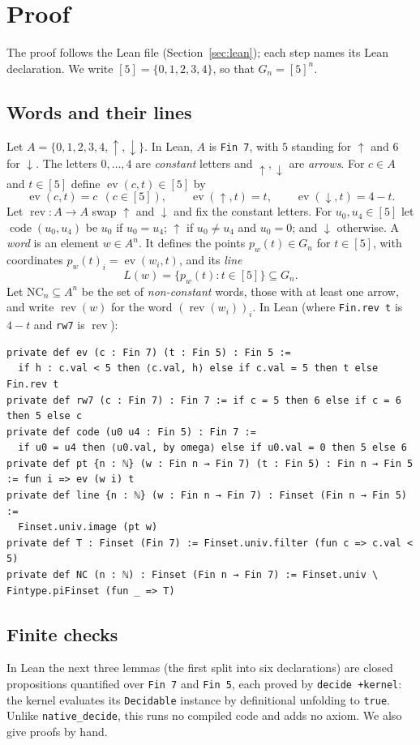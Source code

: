 \documentclass[11pt]{amsart}
\theoremstyle{plain}
\theoremstyle{definition}
\newcommand{\up}{{\uparrow}}
\newcommand{\dn}{{\downarrow}}
\newcommand{\ev}{\operatorname{ev}}
\newcommand{\rev}{\operatorname{rev}}
\newcommand{\code}{\operatorname{code}}
\newcommand{\NC}{\mathrm{NC}}
\begin{document}
\section{Proof}\label{sec:proof}

The proof follows the Lean file (Section~\ref{sec:lean}); each step names its Lean declaration. We write $[5]=\{0,1,2,3,4\}$, so that $G_n=[5]^n$.

\subsection{Words and their lines}
Let $A=\{0,1,2,3,4,\up,\dn\}$. In Lean, $A$ is \texttt{Fin 7}, with $5$ standing for $\up$ and $6$ for $\dn$.
The letters $0,\dots,4$ are \emph{constant} letters and $\up,\dn$ are \emph{arrows}.
For $c\in A$ and $t\in[5]$ define $\ev(c,t)\in[5]$ by
\[
  \ev(c,t)=c\ \ (c\in[5]),\qquad \ev(\up,t)=t,\qquad \ev(\dn,t)=4-t .
\]
Let $\rev\colon A\to A$ swap $\up$ and $\dn$ and fix the constant letters. For $u_0,u_4\in[5]$ let $\code(u_0,u_4)$ be $u_0$ if $u_0=u_4$; $\up$ if $u_0\ne u_4$ and $u_0=0$; and $\dn$ otherwise.
A \emph{word} is an element $w\in A^n$. It defines the points $p_w(t)\in G_n$ for $t\in[5]$, with coordinates $p_w(t)_i=\ev(w_i,t)$, and its \emph{line}
\[
  L(w)=\{p_w(t): t\in[5]\}\subseteq G_n .
\]
Let $\NC_n\subseteq A^n$ be the set of \emph{non-constant} words, those with at least one arrow, and write $\rev(w)$ for the word $(\rev(w_i))_i$.
In Lean (where \texttt{Fin.rev t} is $4-t$ and \texttt{rw7} is $\rev$):
\begin{lstlisting}
private def ev (c : Fin 7) (t : Fin 5) : Fin 5 :=
  if h : c.val < 5 then ⟨c.val, h⟩ else if c.val = 5 then t else Fin.rev t
private def rw7 (c : Fin 7) : Fin 7 := if c = 5 then 6 else if c = 6 then 5 else c
private def code (u0 u4 : Fin 5) : Fin 7 :=
  if u0 = u4 then ⟨u0.val, by omega⟩ else if u0.val = 0 then 5 else 6
private def pt {n : ℕ} (w : Fin n → Fin 7) (t : Fin 5) : Fin n → Fin 5 := fun i => ev (w i) t
private def line {n : ℕ} (w : Fin n → Fin 7) : Finset (Fin n → Fin 5) :=
  Finset.univ.image (pt w)
private def T : Finset (Fin 7) := Finset.univ.filter (fun c => c.val < 5)
private def NC (n : ℕ) : Finset (Fin n → Fin 7) := Finset.univ \ Fintype.piFinset (fun _ => T)
\end{lstlisting}

\subsection{Finite checks}
In Lean the next three lemmas (the first split into six declarations) are closed propositions quantified over \texttt{Fin 7} and \texttt{Fin 5}, each proved by \texttt{decide +kernel}: the kernel evaluates its \texttt{Decidable} instance by definitional unfolding to \texttt{true}. Unlike \texttt{native\_decide}, this runs no compiled code and adds no axiom. We also give proofs by hand.
\end{document}
